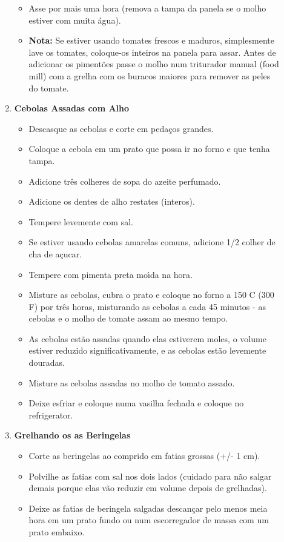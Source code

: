 \documentclass [11pt, letterpaper] {article}
\begin{document}
\begin{description}
\begin{enumerate}
\begin{itemize}
	\item Asse por mais uma hora (remova a tampa da panela se o molho estiver com muita \'agua).
	\item {\bf Nota:} Se estiver usando tomates frescos e maduros, simplesmente lave os tomates, coloque-os inteiros na panela para assar. Antes de adicionar os piment\~oes passe o molho num triturador manual (food mill) com a grelha com os buracos maiores para remover as peles do tomate.
	\end{itemize}
	\item {\bf Cebolas Assadas com Alho}
	\begin{itemize}
        		\item Descasque as cebolas e corte em peda\c{c}os grandes.
		\item Coloque a cebola em um prato que possa ir no forno e que tenha tampa.
		\item Adicione tr\^es colheres de sopa do azeite perfumado.
		\item Adicione os dentes de alho restates (interos).
		\item Tempere levemente com sal.
		\item Se estiver usando cebolas amarelas comuns, adicione 1/2 colher de cha de a\c{c}ucar.
		\item Tempere com pimenta preta mo\'{\i}da na hora.
		\item Misture as cebolas, cubra o prato e coloque no forno a 150 C (300 F) por tr\^es horas, misturando as cebolas a cada 45 minutos - as cebolas e o molho de tomate assam ao mesmo tempo.
		\item As cebolas est\~ao assadas quando elas estiverem moles, o volume estiver reduzido significativamente, e as cebolas est\~ao levemente douradas.
		\item Misture as cebolas assadas no molho de tomato assado.
		\item Deixe esfriar e coloque numa vasilha fechada e coloque no refrigerator.
	\end{itemize}
	\item {\bf Grelhando os as Beringelas}
	\begin{itemize}	
		\item Corte as beringelas ao comprido em fatias grossas (+/- 1 cm).
		\item Polvilhe as fatias com sal nos dois lados (cuidado para n\~ao salgar demais porque elas v\~ao reduzir em volume depois de grelhadas).
		\item Deixe as fatias de beringela salgadas descan\c{c}ar pelo  menos meia hora em um prato fundo ou num escorregador de massa com um prato embaixo. 

\end{itemize}
\end{enumerate}
\end{description}
\end{document}
